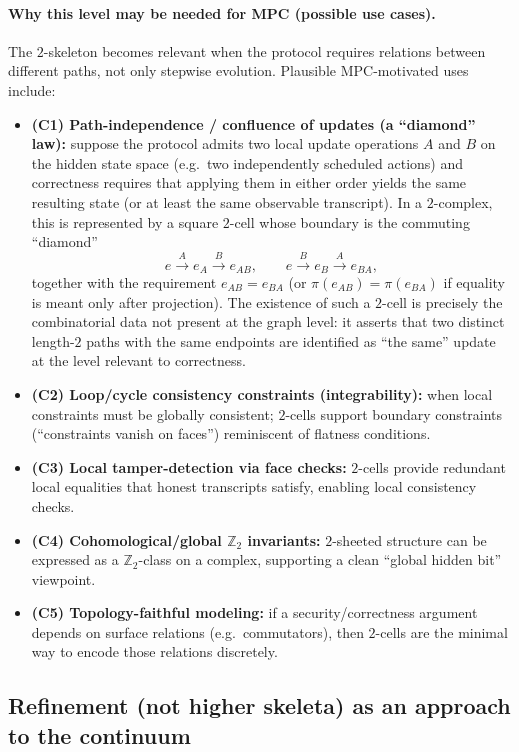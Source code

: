 \documentclass[11pt,a4paper]{article}
\theoremstyle{definition}
\theoremstyle{remark}
\begin{document}
\paragraph{Why this level may be needed for MPC (possible use cases).}
The \(2\)-skeleton becomes relevant when the protocol requires relations between different paths, not only stepwise evolution. Plausible MPC-motivated uses include:
\begin{itemize}
  \item \textbf{(C1) Path-independence / confluence of updates (a ``diamond'' law):} suppose the protocol admits two local update operations \(A\) and \(B\) on the hidden state space (e.g.\ two independently scheduled actions) and correctness requires that applying them in either order yields the same resulting state (or at least the same observable transcript). In a \(2\)-complex, this is represented by a square \(2\)-cell whose boundary is the commuting ``diamond''
  \[
  e \xrightarrow{\ A\ } e_A \xrightarrow{\ B\ } e_{AB},
  \qquad
  e \xrightarrow{\ B\ } e_B \xrightarrow{\ A\ } e_{BA},
  \]
  together with the requirement \(e_{AB}=e_{BA}\) (or \(\pi(e_{AB})=\pi(e_{BA})\) if equality is meant only after projection). The existence of such a \(2\)-cell is precisely the combinatorial data not present at the graph level: it asserts that two distinct length-\(2\) paths with the same endpoints are identified as ``the same'' update at the level relevant to correctness.
  \item \textbf{(C2) Loop/cycle consistency constraints (integrability):} when local constraints must be globally consistent; \(2\)-cells support boundary constraints (``constraints vanish on faces'') reminiscent of flatness conditions.
  \item \textbf{(C3) Local tamper-detection via face checks:} \(2\)-cells provide redundant local equalities that honest transcripts satisfy, enabling local consistency checks.
  \item \textbf{(C4) Cohomological/global \(\mathbb{Z}_2\) invariants:} \(2\)-sheeted structure can be expressed as a \(\mathbb{Z}_2\)-class on a complex, supporting a clean ``global hidden bit'' viewpoint.
  \item \textbf{(C5) Topology-faithful modeling:} if a security/correctness argument depends on surface relations (e.g.\ commutators), then \(2\)-cells are the minimal way to encode those relations discretely.
\end{itemize}

\subsection{Refinement (not higher skeleta) as an approach to the continuum}
\label{sec:refinement-to-continuum}
\end{document}
